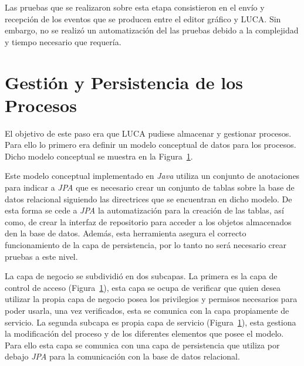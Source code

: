 Las pruebas que se realizaron sobre esta etapa consistieron en el envío y recepción de los eventos que se producen entre el editor gráfico y LUCA. Sin embargo, no se realizó un automatización del las pruebas debido a la complejidad y tiempo necesario que requería.

\section{Gestión y Persistencia de los Procesos}

El objetivo de este paso era que LUCA pudiese almacenar y gestionar procesos. Para ello lo primero era definir un modelo conceptual de datos para los procesos. Dicho modelo conceptual se muestra en la Figura~\ref{}.

Este modelo conceptual implementado en \emph{Java} utiliza un conjunto de anotaciones para indicar a \emph{JPA}\cite{jpa} que es necesario crear un conjunto de tablas sobre la base de datos relacional siguiendo las directrices que se encuentran en dicho modelo. De esta forma se cede a \emph{JPA} la automatización para la creación de las tablas, así como, de crear la interfaz de repositorio para acceder a los objetos almacenados den la base de datos. Además, esta herramienta asegura el correcto funcionamiento de la capa de persistencia, por lo tanto no será necesario crear pruebas a este nivel.

La capa de negocio se subdividió en dos subcapas. La primera es la capa de control de acceso (Figura~\ref{}), esta capa se ocupa de verificar que quien desea utilizar la propia capa de negocio posea los privilegios y permisos necesarios para poder usarla, una vez verificados, esta se comunica con la capa propiamente de servicio. La segunda subcapa es propia capa de servicio (Figura~\ref{}), esta gestiona la modificación del proceso y de los diferentes elementos que posee el modelo. Para ello esta capa se comunica con una capa de persistencia que utiliza por debajo \emph{JPA} para la comunicación con la base de datos relacional.



